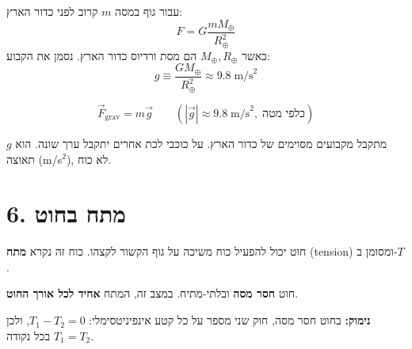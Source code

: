 \documentclass[12pt, a4paper]{article}
\newcommand{\hvec}[1]{\overrightarrow{#1}}
\begin{document}
עבור גוף במסה \textenglish{$m$} קרוב לפני כדור הארץ:
\[
  F = G\frac{m M_\oplus}{R_\oplus^2}
\]
כאשר \textenglish{$M_\oplus, R_\oplus$} הם מסת ורדיוס כדור הארץ. נסמן את הקבוע:
\[
  g \equiv \frac{GM_\oplus}{R_\oplus^2} \approx 9.8\;\text{m/s}^2
\]

\begin{tcolorbox}[resultbox]
\[
  \hvec{F}_{\text{grav}} = m\hvec{g}
  \qquad (|\hvec{g}| \approx 9.8\;\text{m/s}^2,\;\text{כלפי מטה})
\]
\end{tcolorbox}

\begin{tcolorbox}[notebox]
\textenglish{$g$} מתקבל מקבועים מסוימים של כדור הארץ. על כוכבי לכת אחרים יתקבל ערך שונה. הוא תאוצה (\textenglish{m/s$^2$}), לא כוח.
\end{tcolorbox}

\section*{6. מתח בחוט}

חוט יכול להפעיל כוח משיכה על גוף הקשור לקצהו. כוח זה נקרא \textbf{מתח} (\textenglish{tension}) ומסומן ב-\textenglish{$T$}.

\begin{center}
\end{center}

\begin{tcolorbox}[defbox, title={חוט אידיאלי}]
חוט \textbf{חסר מסה} ובלתי-מתיח. במצב זה, המתח \textbf{אחיד לכל אורך החוט}.
\end{tcolorbox}

\textbf{נימוק:} בחוט חסר מסה, חוק שני מספר על כל קטע אינפיניטסימלי: \textenglish{$T_1 - T_2 = 0$}, ולכן \textenglish{$T_1 = T_2$} בכל נקודה.
\end{document}
